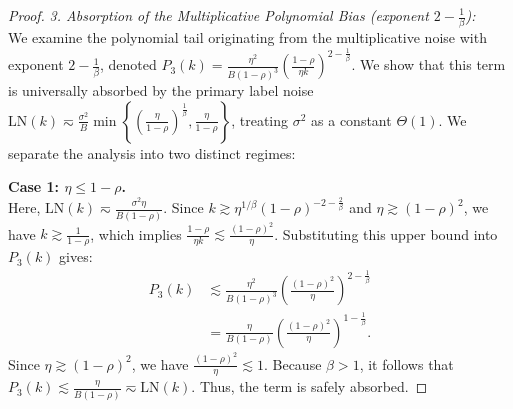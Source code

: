 \begin{proof}
\textit{3. Absorption of the Multiplicative Polynomial Bias (exponent $2-\frac{1}{\beta}$):} \\
We examine the polynomial tail originating from the multiplicative noise with exponent $2-\frac{1}{\beta}$, denoted $P_3(k) = \frac{\eta^2}{B(1-\rho)^3}\left(\frac{1-\rho}{\eta k}\right)^{2-\frac1\beta}$. We show that this term is universally absorbed by the primary label noise $\text{LN}(k) \eqsim \frac{\sigma^2}{B} \min\left\{ \left(\frac{\eta}{1-\rho}\right)^{\frac1\beta}, \frac{\eta}{1-\rho} \right\}$, treating $\sigma^2$ as a constant $\Theta(1)$. We separate the analysis into two distinct regimes:

\textbf{Case 1: $\eta \le 1-\rho$.} \\
Here, $\text{LN}(k) \eqsim \frac{\sigma^2\eta}{B(1-\rho)}$. Since $k \gtrsim \eta^{1/\beta}(1-\rho)^{-2-\frac{2}{\beta}}$ and $\eta \gtrsim (1-\rho)^2$, we have $k \gtrsim \frac{1}{1-\rho}$, which implies $\frac{1-\rho}{\eta k} \lesssim \frac{(1-\rho)^2}{\eta}$. Substituting this upper bound into $P_3(k)$ gives:
\begin{align*}
    P_3(k) &\lesssim \frac{\eta^2}{B(1-\rho)^3} \left(\frac{(1-\rho)^2}{\eta}\right)^{2-\frac{1}{\beta}} \\
    &= \frac{\eta}{B(1-\rho)} \left(\frac{(1-\rho)^2}{\eta}\right)^{1-\frac{1}{\beta}}.
\end{align*}
Since $\eta \gtrsim (1-\rho)^2$, we have $\frac{(1-\rho)^2}{\eta} \lesssim 1$. Because $\beta > 1$, it follows that $P_3(k) \lesssim \frac{\eta}{B(1-\rho)} \eqsim \text{LN}(k)$. Thus, the term is safely absorbed.


\end{proof}
